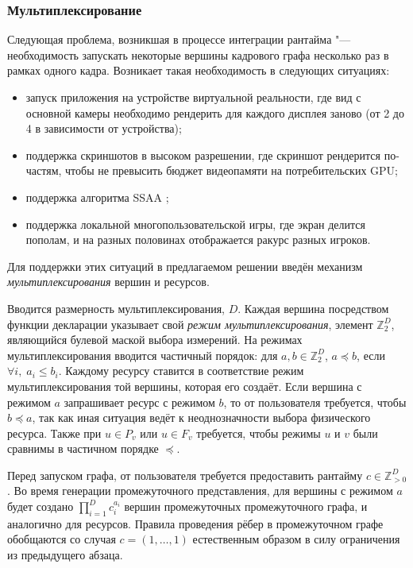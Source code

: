 \subsubsection{Мультиплексирование}
Следующая проблема, возникшая в процессе интеграции рантайма "--- необходимость запускать некоторые вершины кадрового графа несколько раз в рамках одного кадра.
Возникает такая необходимость в следующих ситуациях:
\begin{itemize}
    \item запуск приложения на устройстве виртуальной реальности, где вид с основной камеры необходимо рендерить для каждого дисплея заново (от 2 до 4 в зависимости от устройства);
    \item поддержка скриншотов в высоком разрешении, где скриншот рендерится по-частям, чтобы не превысить бюджет видеопамяти на потребительских GPU;
    \item поддержка алгоритма SSAA ;
    \item поддержка локальной многопользовательской игры, где экран делится пополам, и на разных половинах отображается ракурс разных игроков.
\end{itemize}
Для поддержки этих ситуаций в предлагаемом решении введён механизм \textit{мультиплексирования} вершин и ресурсов.

Вводится размерность мультиплексирования, $D$.
Каждая вершина посредством функции декларации указывает свой \textit{режим мультиплексирования}, элемент $\mathbb{Z}_2^D$, являющийся булевой маской выбора измерений.
На режимах мультиплексирования вводится частичный порядок: для $a,b\in\mathbb{Z}_2^D$, $a \preceq b$, если $\forall i,\;a_i \leqslant b_i$.
Каждому ресурсу ставится в соответствие режим мультиплексирования той вершины, которая его создаёт.
Если вершина с режимом $a$ запрашивает ресурс с режимом $b$, то от пользователя требуется, чтобы $b \preceq a$, так как иная ситуация ведёт к неоднозначности выбора физического ресурса.
Также при $u \in P_v$ или $u \in F_v$ требуется, чтобы режимы $u$ и $v$ были сравнимы в частичном порядке $\preceq$.

Перед запуском графа, от пользователя требуется предоставить рантайму $c \in \mathbb{Z}_{>0}^D$.
Во время генерации промежуточного представления, для вершины с режимом $a$ будет создано $\prod_{i=1}^{D} c_i^{a_i}$ вершин  промежуточных промежуточного графа, и аналогично для ресурсов.
Правила проведения рёбер в промежуточном графе обобщаются со случая $c = \left(1, \dots, 1\right)$ естественным образом в силу ограничения из предыдущего абзаца.

